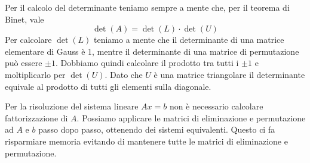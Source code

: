 Per il calcolo del determinante teniamo sempre a mente che, per il teorema di Binet, vale
\[ \det(A) = \det(L) \cdot \det(U) \]
Per calcolare $\det(L)$ teniamo a mente che il determinante di una matrice elementare di Gauss è 1, mentre il
determinante di una matrice di permutazione può essere $\pm 1$. Dobbiamo quindi calcolare il prodotto tra tutti
i $\pm 1$ e moltiplicarlo per $\det(U)$. Dato che $U$ è una matrice triangolare il determinante equivale al
prodotto di tutti gli elementi sulla diagonale.

Per la risoluzione del sistema lineare $Ax = b$ non è necessario calcolare fattorizzazione di $A$. Possiamo
applicare le matrici di eliminazione e permutazione ad $A$ e $b$ passo dopo passo, ottenendo dei sistemi
equivalenti. Questo ci fa risparmiare memoria evitando di mantenere tutte le matrici di eliminazione e
permutazione.
